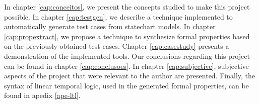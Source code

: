 In chapter \ref{cap:conceitos}, we present the concepts studied to make this project possible. In chapter \ref{cap:testgen}, we describe a technique implemented to automatically generate test cases from statechart models. In chapter \ref{cap:propextract}, we propose a technique to synthesize formal properties based on the previously obtained test cases. Chapter \ref{cap:casestudy} presents a demonstration of the implemented tools. Our conclusions regarding this project can be found in chapter \ref{cap:conclusoes}. In chapter \ref{cap:subjective}, subjective aspects of the project that were relevant to the author are presented. Finally, the syntax of linear temporal logic, used in the generated formal properties, can be found in apedix \ref{ape-ltl}.
